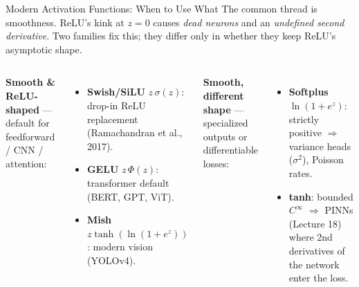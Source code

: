 \documentclass[aspectratio=169,11pt]{beamer}
\newcommand{\emphc}[1]{\textcolor{harvardcrimson}{#1}}
\begin{document}
\begin{frame}{Modern Activation Functions: When to Use What}
{\footnotesize The common thread is \emphc{smoothness}. ReLU's kink at $z{=}0$ causes \textit{dead neurons} and an \textit{undefined second derivative}. Two families fix this; they differ only in whether they keep ReLU's asymptotic shape.}

\begin{columns}[T]
\textbf{\textcolor{softblue}{Smooth \& ReLU-shaped}} {\footnotesize --- default for feedforward / CNN / attention:}
\begin{itemize}\itemsep0pt
    \item[\textcolor{softblue}{$\blacktriangleright$}] {\footnotesize \textbf{Swish/SiLU} $z\,\sigma(z)$: drop-in ReLU replacement (Ramachandran et al., 2017).}
    \item[\textcolor{harvardcrimson}{$\blacktriangleright$}] {\footnotesize \textbf{GELU} $z\,\Phi(z)$: transformer default (BERT, GPT, ViT).}
    \item[\textcolor{softgreen}{$\blacktriangleright$}] {\footnotesize \textbf{Mish} $z\tanh(\ln(1{+}e^z))$: modern vision (YOLOv4).}
\end{itemize}

\vspace{0.1cm}
\textbf{\textcolor{softorange}{Smooth, different shape}} {\footnotesize --- specialized outputs or differentiable losses:}
\begin{itemize}\itemsep0pt
    \item[\textcolor{softorange}{$\blacktriangleright$}] {\footnotesize \textbf{Softplus} $\ln(1{+}e^z)$: strictly positive $\Rightarrow$ variance heads ($\sigma^2$), Poisson rates.}
    \item[\textcolor{uzhblue}{$\blacktriangleright$}] {\footnotesize \textbf{tanh}: bounded $C^\infty$ $\Rightarrow$ PINNs (Lecture 18) where 2nd derivatives of the network enter the loss.}
\end{itemize}


\end{columns}
\end{frame}
\end{document}
